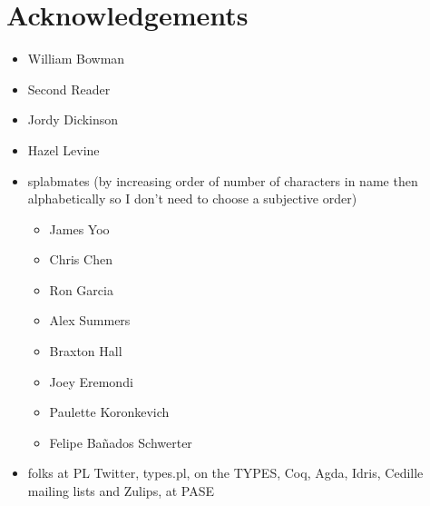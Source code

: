 \chapter{Acknowledgements}

\begin{itemize}[noitemsep]
  \item William Bowman
  \item Second Reader
  \item Jordy Dickinson
  \item Hazel Levine
  \item splabmates (by increasing order of number of characters in name then alphabetically so I don't need to choose a subjective order)
    \begin{itemize}[noitemsep]
      \item James Yoo
      \item Chris Chen
      \item Ron Garcia
      \item Alex Summers
      \item Braxton Hall
      \item Joey Eremondi
      \item Paulette Koronkevich
      \item Felipe Ba\~nados Schwerter
    \end{itemize}
  \item folks at PL Twitter, types.pl, on the TYPES, Coq, Agda, Idris, Cedille mailing lists and Zulips, at PASE
\end{itemize}